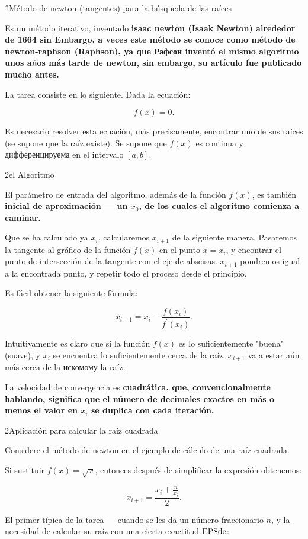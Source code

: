 \h1{Método de newton (tangentes) para la búsqueda de las raíces}

Es un método iterativo, inventado \bf{isaac newton} (Isaak Newton) alrededor de 1664 sin Embargo, a veces este método se conoce como método de newton-raphson (Raphson), ya que Рафсон inventó el mismo algoritmo unos años más tarde de newton, sin embargo, su artículo fue publicado mucho antes.

La tarea consiste en lo siguiente. Dada la ecuación:

$$ f(x) = 0. $$

Es necesario resolver esta ecuación, más precisamente, encontrar uno de sus raíces (se supone que la raíz existe). Se supone que $f(x)$ es continua y дифференцируема en el intervalo $[a, b]$.


\h2{el Algoritmo}

El parámetro de entrada del algoritmo, además de la función $f(x)$, es también \bf{inicial de aproximación} --- un $x_0$, de los cuales el algoritmo comienza a caminar.

Que se ha calculado ya $x_i$, calcularemos $x_{i+1}$ de la siguiente manera. Pasaremos la tangente al gráfico de la función $f(x)$ en el punto $x = x_i$, y encontrar el punto de intersección de la tangente con el eje de abscisas. $x_{i+1}$ pondremos igual a la encontrada punto, y repetir todo el proceso desde el principio.

Es fácil obtener la siguiente fórmula:

$$ x_{i+1} = x_i - \frac{ f(x_i) }{ f^\prime(x_i) }. $$

Intuitivamente es claro que si la función $f(x)$ es lo suficientemente "buena" (suave), y $x_i$ se encuentra lo suficientemente cerca de la raíz, $x_{i+1}$ va a estar aún más cerca de la искомому la raíz.

La velocidad de convergencia es \bf{cuadrática}, que, convencionalmente hablando, significa que el número de decimales exactos en más o menos el valor en $x_i$ se duplica con cada iteración.


\h2{Aplicación para calcular la raíz cuadrada}

Considere el método de newton en el ejemplo de cálculo de una raíz cuadrada.

Si sustituir $f(x) = \sqrt{x}$, entonces después de simplificar la expresión obtenemos:

$$ x_{i+1} = \frac{ x_i + \frac{n}{x_i} }{ 2 }. $$

El primer típica de la tarea --- cuando se les da un número fraccionario $n$, y la necesidad de calcular su raíz con una cierta exactitud $\rm EPS de$:

